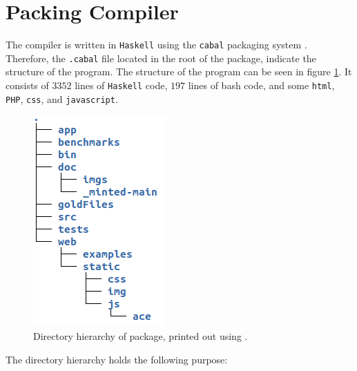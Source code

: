 \section{Packing Compiler \rr}
The \lan compiler is written in \texttt{Haskell} using the \texttt{cabal} packaging system
\cite{cabal}. Therefore, the \texttt{.cabal} file located in the root of the package, indicate
the structure of the program. The structure of the program can be seen in figure
\ref{fig:structure}. It consists of $3352$ lines of \texttt{Haskell} code, $197$ lines of
bash code, and some \texttt{html}, \texttt{PHP}, \texttt{css}, and \texttt{javascript}.

\begin{figure}[H]
    \centering
    \includegraphics[scale=0.7]{imgs/directory-structure.png}
    \caption{Directory hierarchy of \lan package, printed out using .}
    \label{fig:structure}
\end{figure}
\noindent
The directory hierarchy holds the following purpose:

